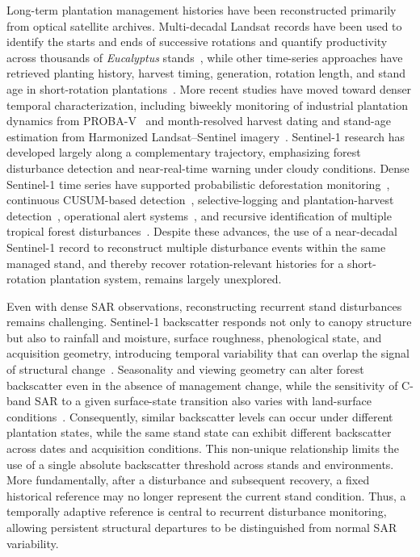 Long-term plantation management histories have been reconstructed primarily from optical satellite archives. Multi-decadal Landsat records have been used to identify the starts and ends of successive rotations and quantify productivity across thousands of \textit{Eucalyptus} stands~\citep{McMahon2019EucalyptusRotations}, while other time-series approaches have retrieved planting history, harvest timing, generation, rotation length, and stand age in short-rotation plantations~\citep{Du2022GlobalPlantingYears,Li2022EucalyptusHistory}. More recent studies have moved toward denser temporal characterization, including biweekly monitoring of industrial plantation dynamics from PROBA-V~\citep{Bos2025PlantationDynamics} and month-resolved harvest dating and stand-age estimation from Harmonized Landsat--Sentinel imagery~\citep{Huang2026EucalyptusAge}. Sentinel-1 research has developed largely along a complementary trajectory, emphasizing forest disturbance detection and near-real-time warning under cloudy conditions. Dense Sentinel-1 time series have supported probabilistic deforestation monitoring~\citep{Reiche2018Bayesian}, continuous CUSUM-based detection~\citep{RuizRamos2020CUSUMSMC,Ygorra2021CuSum}, selective-logging and plantation-harvest detection~\citep{Matthew2021BFAST,Xulu2020PlantationHarvest}, operational alert systems~\citep{Doblas2022DETERR,Bullock2022CCDC_S1,Mullissa2024LUCA}, and recursive identification of multiple tropical forest disturbances~\citep{Ygorra2023ReCuSum}. Despite these advances, the use of a near-decadal Sentinel-1 record to reconstruct multiple disturbance events within the same managed stand, and thereby recover rotation-relevant histories for a short-rotation plantation system, remains largely unexplored.

Even with dense SAR observations, reconstructing recurrent stand disturbances remains challenging. Sentinel-1 backscatter responds not only to canopy structure but also to rainfall and moisture, surface roughness, phenological state, and acquisition geometry, introducing temporal variability that can overlap the signal of structural change~\citep{Reiche2018Bayesian,Doblas2020harmonic,Matthew2021BFAST,vanDerWoude2024S1Disturbance,BorlafMena2023Seasonality}. Seasonality and viewing geometry can alter forest backscatter even in the absence of management change, while the sensitivity of C-band SAR to a given surface-state transition also varies with land-surface conditions~\citep{BorlafMena2023Seasonality,Zhao2021SARExclusion}. Consequently, similar backscatter levels can occur under different plantation states, while the same stand state can exhibit different backscatter across dates and acquisition conditions. This non-unique relationship limits the use of a single absolute backscatter threshold across stands and environments. More fundamentally, after a disturbance and subsequent recovery, a fixed historical reference may no longer represent the current stand condition. Thus, a temporally adaptive reference is central to recurrent disturbance monitoring, allowing persistent structural departures to be distinguished from normal SAR variability. 

